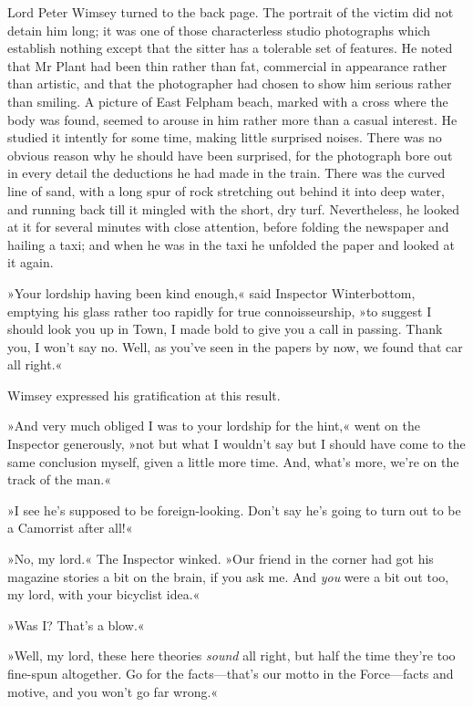 Lord Peter Wimsey turned to the back page. The portrait of the victim did not detain him long; it was one of those characterless studio photographs which establish nothing except that the sitter has a tolerable set of features. He noted that Mr Plant had been thin rather than fat, commercial in appearance rather than artistic, and that the photographer had chosen to show him serious rather than smiling. A picture of East Felpham beach, marked with a cross where the body was found, seemed to arouse in him rather more than a casual interest. He studied it intently for some time, making little surprised noises. There was no obvious reason why he should have been surprised, for the photograph bore out in every detail the deductions he had made in the train. There was the curved line of sand, with a long spur of rock stretching out behind it into deep water, and running back till it mingled with the short, dry turf. Nevertheless, he looked at it for several minutes with close attention, before folding the newspaper and hailing a taxi; and when he was in the taxi he unfolded the paper and looked at it again.

»Your lordship having been kind enough,« said Inspector Winterbottom, emptying his glass rather too rapidly for true connoisseurship, »to suggest I should look you up in Town, I made bold to give you a call in passing. Thank you, I won't say no. Well, as you've seen in the papers by now, we found that car all right.«

Wimsey expressed his gratification at this result.

»And very much obliged I was to your lordship for the hint,« went on the Inspector generously, »not but what I wouldn't say but I should have come to the same conclusion myself, given a little more time. And, what's more, we're on the track of the man.«

»I see he's supposed to be foreign-looking. Don't say he's going to turn out to be a Camorrist after all!«

»No, my lord.« The Inspector winked. »Our friend in the corner had got his magazine stories a bit on the brain, if you ask me. And \textit{you} were a bit out too, my lord, with your bicyclist idea.«

»Was I? That's a blow.«

»Well, my lord, these here theories \textit{sound} all right, but half the time they're too fine-spun altogether. Go for the facts—that's our motto in the Force—facts and motive, and you won't go far wrong.«

